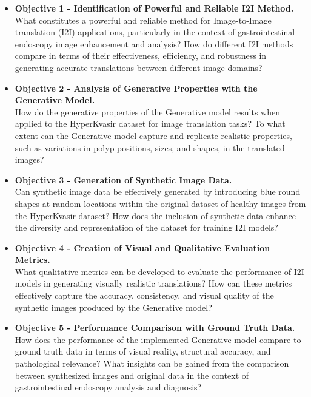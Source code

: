\documentclass[UKenglish,12pt]{master-style}
\begin{document}
\begin{itemize}
\item \textbf{Objective 1 - Identification of Powerful and Reliable I2I Method. }\\
What constitutes a powerful and reliable method for Image-to-Image translation (I2I) applications, particularly in the context of gastrointestinal endoscopy image enhancement and analysis? How do different I2I methods compare in terms of their effectiveness, efficiency, and robustness in generating accurate translations between different image domains?

\item \textbf{Objective 2 - Analysis of Generative Properties with the Generative Model.}\\
How do the generative properties of the Generative model results when applied to the HyperKvasir dataset for image translation tasks?
To what extent can the Generative model capture and replicate realistic properties, such as variations in polyp positions, sizes, and shapes, in the translated images?

\item \textbf{Objective 3 - Generation of Synthetic Image Data.}\\
Can synthetic image data be effectively generated by introducing blue round shapes at random locations within the original dataset of healthy images from the HyperKvasir dataset? How does the inclusion of synthetic data enhance the diversity and representation of the dataset for training I2I models?

\item \textbf{Objective 4 - Creation of Visual and Qualitative Evaluation Metrics.}\\
What qualitative metrics can be developed to evaluate the performance of I2I models in generating visually realistic translations? How can these metrics effectively capture the accuracy, consistency, and visual quality of the synthetic images produced by the Generative model?

\item \textbf{Objective 5 - Performance Comparison with Ground Truth Data.}\\
How does the performance of the implemented Generative model compare to ground truth data in terms of visual reality, structural accuracy, and pathological relevance? What insights can be gained from the comparison between synthesized images and original data in the context of gastrointestinal endoscopy analysis and diagnosis?

\end{itemize}
\end{document}
